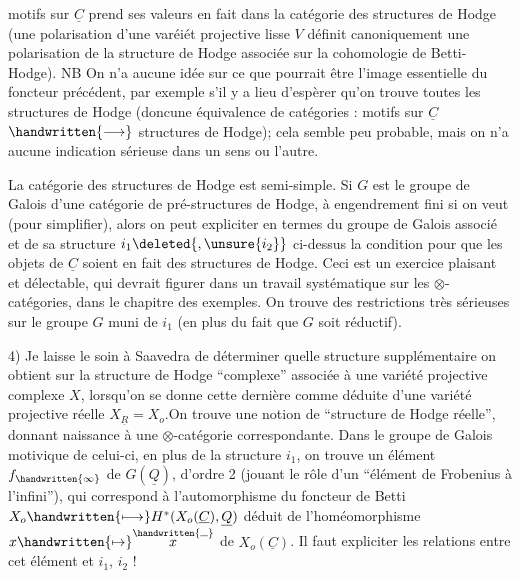%
motifs sur $\underline{C}$ prend ses valeurs en fait dans la catégorie des structures de Hodge (une polarisation d'une varéiét projective lisse $V$ définit canoniquement une polarisation de la structure de Hodge associée sur la cohomologie de Betti-Hodge). NB On n'a aucune idée sur ce que pourrait être l'image essentielle du foncteur précédent, par exemple s'il y a lieu d'espèrer qu'on trouve toutes les structures de Hodge (doncune équivalence de catégories : motifs sur $\underline{C}$ $\handwritten{\longrightarrow}$ structures de Hodge); cela semble peu probable, mais on n'a aucune indication sérieuse dans un sens ou l'autre.

La catégorie des  structures de Hodge est semi-simple.  Si $G$ est le groupe de Galois d'une \inserted{$\unsure{\otimes|\Omega}$-}catégorie  de pré-structures de Hodge, à engendrement fini si on veut (pour simplifier), alors on peut expliciter en termes du groupe de Galois associé et de sa structure $i_1\deleted{,\unsure{i_2}}$ ci-dessus la condition  pour que les objets de $\underline{C}$ soient en fait des structures de Hodge. Ceci est un exercice plaisant et délectable, qui devrait figurer dans un travail systématique sur les $\otimes$-catégories, dans le chapitre des exemples. On trouve des restrictions très sérieuses sur le groupe $G$  muni de $i_1$ (en plus du fait que $G$ soit réductif).

4) Je laisse le soin à Saavedra de déterminer quelle structure supplémentaire on obtient sur la structure de Hodge ``complexe'' associée à une variété projective  complexe $X$, lorsqu'on se donne cette dernière comme déduite d'une variété projective réelle $X_{\underline{R}}=X_o$.On trouve une notion de ``structure de Hodge réelle'', donnant naissance à une $\otimes$-catégorie correspondante. Dans le groupe de Galois motivique de celui-ci, en plus de la structure $i_1$, on trouve un élément $f_{\handwritten{\infty}}$ de $G(\underline{Q})$,  d'ordre 2 (jouant le rôle d'un ``élément de Frobenius à l'infini''), qui correspond à l'automorphisme du foncteur de Betti $X_o\handwritten{\longmapsto} H^*(X_o(\underline{C}),\underline{Q})$ déduit de l'homéomorphisme $x\handwritten{\mapsto}\overset{\handwritten{\rule{.55em}{.35pt}}}{x}$ de $X_o(\underline{C})$. Il faut expliciter les relations entre cet élément et $i_1$, $i_2$ !
